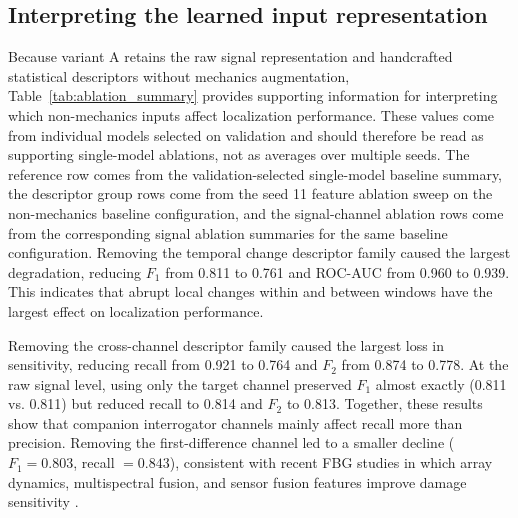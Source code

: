 \documentclass[fleqn,10pt]{wlscirep}
\begin{document}
\subsection*{Interpreting the learned input representation}

Because variant A retains the raw signal representation and handcrafted statistical descriptors without mechanics augmentation, Table~\ref{tab:ablation_summary} provides supporting information for interpreting which non-mechanics inputs affect localization performance. These values come from individual models selected on validation and should therefore be read as supporting single-model ablations, not as averages over multiple seeds. The reference row comes from the validation-selected single-model baseline summary, the descriptor group rows come from the seed 11 feature ablation sweep on the non-mechanics baseline configuration, and the signal-channel ablation rows come from the corresponding signal ablation summaries for the same baseline configuration. Removing the temporal change descriptor family caused the largest degradation, reducing $F_1$ from 0.811 to 0.761 and ROC-AUC from 0.960 to 0.939. This indicates that abrupt local changes within and between windows have the largest effect on localization performance.

Removing the cross-channel descriptor family caused the largest loss in sensitivity, reducing recall from 0.921 to 0.764 and $F_2$ from 0.874 to 0.778. At the raw signal level, using only the target channel preserved $F_1$ almost exactly (0.811 vs. 0.811) but reduced recall to 0.814 and $F_2$ to 0.813. Together, these results show that companion interrogator channels mainly affect recall more than precision. Removing the first-difference channel led to a smaller decline ($F_1 = 0.803$, recall $= 0.843$), consistent with recent FBG studies in which array dynamics, multispectral fusion, and sensor fusion features improve damage sensitivity \cite{wang2023,zhao2025,xiong2025}.
\end{document}
